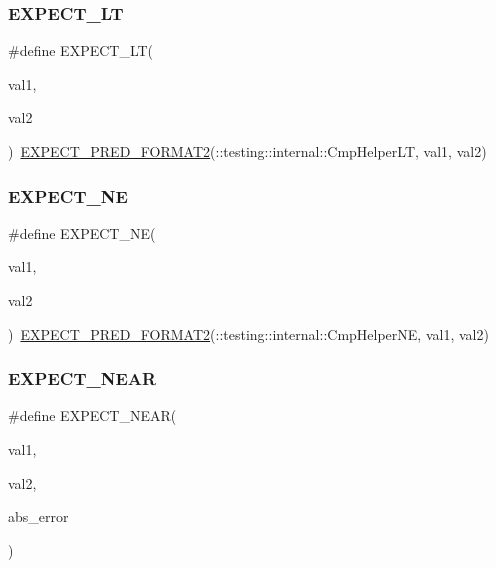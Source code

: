 \mbox{\label{googletest-master_2googletest_2include_2gtest_2gtest_8h_af28c06b2b5e8dee151896f299f6610cf}} 
\subsubsection{\texorpdfstring{EXPECT\_LT}{EXPECT\_LT}}
{\footnotesize\ttfamily \#define E\+X\+P\+E\+C\+T\+\_\+\+LT(\begin{DoxyParamCaption}\item[{}]{val1,  }\item[{}]{val2 }\end{DoxyParamCaption})~\mbox{\hyperlink{_obj__test_2lib_2googletest-release-1_88_81_2googletest_2include_2gtest_2gtest__pred__impl_8h_af0141918615a5e2d5247e9cda8324dae}{E\+X\+P\+E\+C\+T\+\_\+\+P\+R\+E\+D\+\_\+\+F\+O\+R\+M\+A\+T2}}(\+::testing\+::internal\+::\+Cmp\+Helper\+LT, val1, val2)}

\mbox{\label{googletest-master_2googletest_2include_2gtest_2gtest_8h_a6ae7443947f25abc58bfcfcfc56b0d75}} 
\subsubsection{\texorpdfstring{EXPECT\_NE}{EXPECT\_NE}}
{\footnotesize\ttfamily \#define E\+X\+P\+E\+C\+T\+\_\+\+NE(\begin{DoxyParamCaption}\item[{}]{val1,  }\item[{}]{val2 }\end{DoxyParamCaption})~\mbox{\hyperlink{_obj__test_2lib_2googletest-release-1_88_81_2googletest_2include_2gtest_2gtest__pred__impl_8h_af0141918615a5e2d5247e9cda8324dae}{E\+X\+P\+E\+C\+T\+\_\+\+P\+R\+E\+D\+\_\+\+F\+O\+R\+M\+A\+T2}}(\+::testing\+::internal\+::\+Cmp\+Helper\+NE, val1, val2)}

\mbox{\label{googletest-master_2googletest_2include_2gtest_2gtest_8h_a88cd7978af0e7dbd42cd606dfabdcc6f}} 
\subsubsection{\texorpdfstring{EXPECT\_NEAR}{EXPECT\_NEAR}}
{\footnotesize\ttfamily \#define E\+X\+P\+E\+C\+T\+\_\+\+N\+E\+AR(\begin{DoxyParamCaption}\item[{}]{val1,  }\item[{}]{val2,  }\item[{}]{abs\+\_\+error }\end{DoxyParamCaption})}

